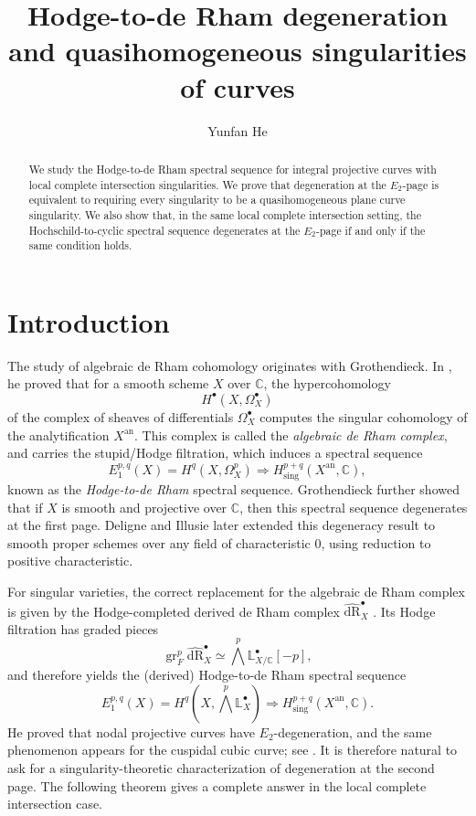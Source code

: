 \documentclass[12pt,reqno]{amsart}
\title[Hodge-to-de Rham degeneration and quasihomogeneity]{Hodge-to-de Rham degeneration and quasihomogeneous singularities of curves}
\author{Yunfan He}
\begin{document}
\begin{abstract}
We study the Hodge-to-de Rham spectral sequence for integral projective curves with local complete intersection singularities. We prove that degeneration at the \(E_2\)-page is equivalent to requiring every singularity to be a quasihomogeneous plane curve singularity. We also show that, in the same local complete intersection setting, the Hochschild-to-cyclic spectral sequence degenerates at the \(E_2\)-page if and only if the same condition holds.
\end{abstract}
\maketitle

\section{Introduction}
The study of algebraic de Rham cohomology originates with Grothendieck. In \cite[Theorem~1']{Grothendieck_66}, he proved that for a smooth scheme \(X\) over \(\mathbb{C}\), the hypercohomology
\[
H^{\bullet}(X, \Omega_X^{\bullet})
\]
of the complex of sheaves of differentials \(\Omega_X^{\bullet}\) computes the singular cohomology of the analytification \(X^{\mathrm{an}}\). This complex is called the \emph{algebraic de Rham complex}, and carries the stupid/Hodge filtration, which induces a spectral sequence
\[
E_1^{p,q}(X) = H^q(X, \Omega_X^p) \Longrightarrow H^{p+q}_{\mathrm{sing}}(X^{\mathrm{an}},\mathbb{C}),
\]
known as the \emph{Hodge-to-de Rham} spectral sequence. Grothendieck \cite[p.9]{Grothendieck_66} further showed that if \(X\) is smooth and projective over \(\mathbb{C}\), then this spectral sequence degenerates at the first page. Deligne and Illusie \cite[Corollary~2.7]{Deligne-Illusie_87} later extended this degeneracy result to smooth proper schemes over any field of characteristic \(0\), using reduction to positive characteristic.

For singular varieties, the correct replacement for the algebraic de Rham complex is given by the Hodge-completed derived de Rham complex \(\widehat{\mathrm{dR}}_X^{\bullet}\) \cite[\S 4.1]{Bhatt_12}. Its Hodge filtration has graded pieces
\[
\operatorname{gr}_F^p \widehat{\mathrm{dR}}_X^{\bullet}\simeq \bigwedge^{p}\mathbb{L}^{\bullet}_{X/\mathbb{C}}[-p],
\]
and therefore yields the (derived) Hodge-to-de Rham spectral sequence
\[
E_1^{p,q}(X) = H^q\!\left(X,\bigwedge^p\mathbb{L}^{\bullet}_X\right) \Longrightarrow H^{p+q}_{\mathrm{sing}}(X^{\mathrm{an}},\mathbb{C}).
\]
He \cite[Theorem~1.1]{He_25} proved that nodal projective curves have \(E_2\)-degeneration, and the same phenomenon appears for the cuspidal cubic curve; see \cite[Theorem~7.1]{He_25}. It is therefore natural to ask for a singularity-theoretic characterization of degeneration at the second page. The following theorem gives a complete answer in the local complete intersection case.
\end{document}
